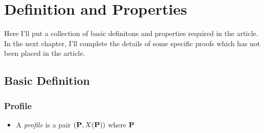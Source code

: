 \chapter{Definition and Properties}

Here I'll put a collection of basic definitons and properties required in the article. In the next chapter, I'll complete the details of some specific proofs which has not been placed in the article.

\section{Basic Definition}

\subsection{Profile}

\begin{definition}
    \begin{itemize}
        \item A \emph{profile} is a pair $(\mathbf{P}, X(\mathbf{P}))$ where $\mathbf{P}$
    \end{itemize}
\end{definition}